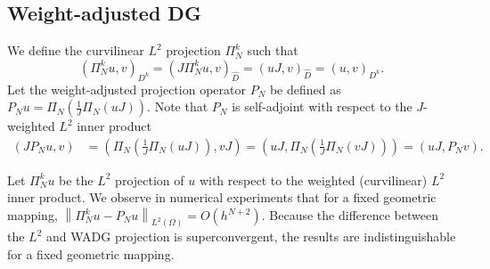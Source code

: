 \documentclass[preprint,10pt]{article}
\theoremstyle{definition}
\theoremstyle{lemma}
\theoremstyle{theorem}
\theoremstyle{assumption}
\renewcommand{\hat}{\widehat}
\newcommand{\nor}[1]{\left\| #1 \right\|}
\newcommand{\LRp}[1]{\left( #1 \right)}
\begin{document}
\subsection{Weight-adjusted DG}


We define the curvilinear $L^2$ projection $\Pi_N^k$ such that
\[
\LRp{\Pi_N^k u,v}_{D^k} = \LRp{J \Pi_N^k u,v}_{\hat{D}} = \LRp{uJ,v}_{\hat{D}} = \LRp{u,v}_{D^k}.  
\]
Let the weight-adjusted projection operator $P_N$ be defined as $P_N u = \Pi_N\LRp{\frac{1}{J}\Pi_N\LRp{uJ}}$.  Note that $P_N$ is self-adjoint with respect to the $J$-weighted $L^2$ inner product
\begin{align*}
\LRp{J P_N u, v} &= \LRp{\Pi_N\LRp{\frac{1}{J}\Pi_N\LRp{uJ}}, vJ} = \LRp{uJ, \Pi_N\LRp{\frac{1}{J}\Pi_N\LRp{vJ}}} =  \LRp{uJ, P_N v}.
\end{align*}

Let $\Pi_N^k u$ be the $L^2$ projection of $u$ with respect to the weighted (curvilinear) $L^2$ inner product.  We observe in numerical experiments that for a fixed geometric mapping, $\nor{\Pi_N^k u - P_N u}_{L^2\LRp{\Omega}} = O(h^{N+2})$.  Because the difference between the $L^2$ and WADG projection is superconvergent, the results are indistinguishable for a fixed geometric mapping.  
\end{document}
